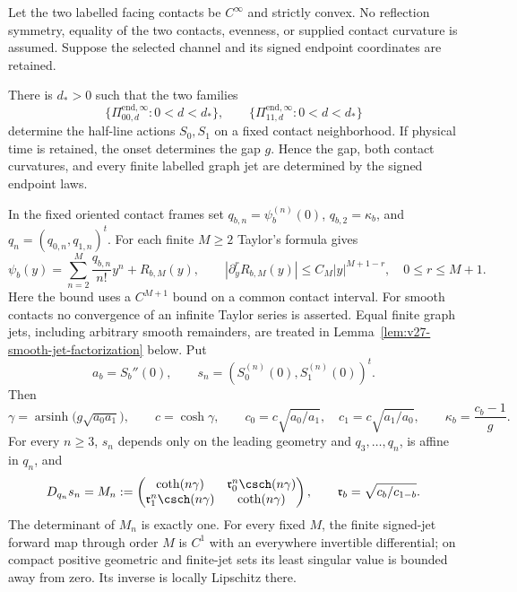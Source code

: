 \begin{theorem}
\label{thm:v22-signed-rigidity}
Let the two labelled facing contacts be $C^\infty$ and strictly convex.  No
reflection symmetry, equality of the two contacts, evenness, or supplied
contact curvature is assumed.  Suppose the selected channel and its signed
endpoint coordinates are retained.

There is $d_*>0$ such that the two families
\[
 \{\Pi^{\mathrm{end},\infty}_{00,d}:0<d<d_*\},\qquad
 \{\Pi^{\mathrm{end},\infty}_{11,d}:0<d<d_*\}
\]
determine the half-line actions $S_0,S_1$ on a fixed contact neighborhood.
If physical time is retained, the onset determines the gap $g$.  Hence the
gap, both contact curvatures, and every finite labelled graph jet are
determined by the signed endpoint laws.

In the fixed oriented contact frames set $q_{b,n}=\psi_b^{(n)}(0)$,
$q_{b,2}=\kappa_b$, and $q_n=(q_{0,n},q_{1,n})^t$.  For each finite
$M\ge2$ Taylor's formula gives
\begin{equation}\label{eq:v22-general-contact-jets}
 \psi_b(y)=\sum_{n=2}^{M}\frac{q_{b,n}}{n!}y^n+R_{b,M}(y),
 \qquad
 |\partial_y^rR_{b,M}(y)|\le C_M|y|^{M+1-r},\quad 0\le r\le M+1.
\end{equation}
Here the bound uses a $C^{M+1}$ bound on a common contact interval.
For smooth contacts no convergence of an infinite Taylor series is
asserted.  Equal finite graph jets, including arbitrary smooth remainders,
are treated in Lemma~\ref{lem:v27-smooth-jet-factorization} below.  Put
\[
 a_b=S_b''(0),\qquad
 s_n=(S_0^{(n)}(0),S_1^{(n)}(0))^t.
\]
Then
\begin{equation}\label{eq:v22-leading-recovery}
 \gamma=\operatorname{arsinh}\!\bigl(g\sqrt{a_0a_1}\bigr),\qquad
 c=\cosh\gamma,
 \qquad
 c_0=c\sqrt{a_0/a_1},\quad c_1=c\sqrt{a_1/a_0},
 \qquad
 \kappa_b=\frac{c_b-1}{g}.
\end{equation}
For every $n\ge3$, $s_n$ depends only on the leading geometry and
$q_3,\ldots,q_n$, is affine in $q_n$, and
\begin{equation}\label{eq:v22-general-jet-block}
 D_{q_n}s_n=M_n:=
 \begin{pmatrix}
 \coth(n\gamma)&\mathfrak r_0^n\csch(n\gamma)\\
 \mathfrak r_1^n\csch(n\gamma)&\coth(n\gamma)
 \end{pmatrix},
 \qquad
 \mathfrak r_b=\sqrt{c_b/c_{1-b}}.
\end{equation}
The determinant of $M_n$ is exactly one.  For every fixed $M$, the finite
signed-jet forward map through order $M$ is $C^1$ with an everywhere
invertible differential; on compact positive geometric and finite-jet sets
its least singular value is bounded away from zero.  Its inverse is locally
Lipschitz there.


\end{theorem}
